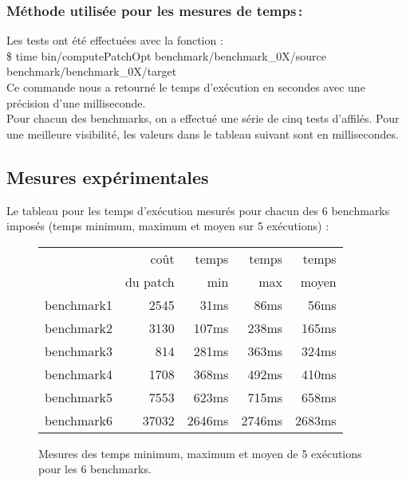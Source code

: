\documentclass[a4paper, 10pt, french]{article}
\begin{document}
    \subsubsection{Méthode utilisée pour les mesures de temps\,: } 
    Les tests ont été effectuées avec la fonction :
\\
\$ time bin/computePatchOpt benchmark/benchmark\_0X/source benchmark/benchmark\_0X/target 
\\
Ce commande nous a retourné le temps d'exécution en secondes avec une précision d'une milliseconde.\\
Pour chacun des benchmarks, on a effectué une série de cinq tests d'affilés. Pour une meilleure visibilité, les valeurs dans le tableau suivant sont en millisecondes.

  \subsection{Mesures expérimentales}
    Le tableau pour les temps d'exécution mesurés pour chacun des 6 benchmarks imposés (temps minimum, maximum et moyen sur 5 exécutions) :

    \begin{figure}[h]
      \begin{center}
        \begin{tabular}{|l||r||r|r|r||}
          \hline
          \hline
            & coût         & temps     & temps   & temps \\
            & du patch     & min       & max     & moyen \\
          \hline
          \hline
            benchmark1 & 2545     & 31ms    & 86ms    & 56ms    \\
          \hline
            benchmark2 & 3130    & 107ms    & 238ms    & 165ms    \\
          \hline
            benchmark3 & 814    & 281ms    & 363ms    & 324ms    \\
          \hline
            benchmark4 & 1708    & 368ms    & 492ms    & 410ms    \\
          \hline
            benchmark5 & 7553    & 623ms    & 715ms    & 658ms     \\
          \hline
            benchmark6 & 37032     & 2646ms    & 2746ms    & 2683ms    \\
          \hline
          \hline
        \end{tabular}
        \caption{ Mesures des temps minimum, maximum et moyen de 5 exécutions pour les 6 benchmarks.}
        \label{table-temps}
      \end{center}
    \end{figure}
\end{document}
